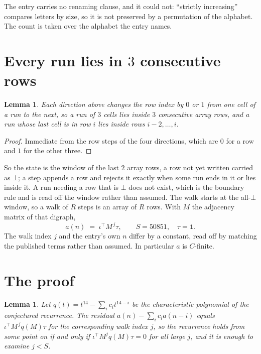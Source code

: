 \documentclass[11pt,a4paper]{article}
\theoremstyle{plain}
\newtheorem{lemma}[theorem]{Lemma}
\theoremstyle{definition}
\begin{document}
The entry carries no renaming clause, and it could not: ``strictly increasing'' compares
letters by size, so it is not preserved by a permutation of the alphabet. The count is taken
over the alphabet the entry names.

\section{Every run lies in $3$ consecutive rows}

\begin{lemma}\label{lem:win}
Each direction above changes the row index by $0$ or $1$ from one cell of a run to the next, so
a run of $3$ cells lies inside $3$ consecutive array rows, and a run whose last cell is in
row $i$ lies inside rows $i-2,\dots,i$.
\end{lemma}

\begin{proof}
Immediate from the row steps of the four directions, which are $0$ for a row and $1$ for the
other three.
\end{proof}

So the state is the window of the last $2$ array rows, a row not yet written carried as
$\bot$; a step appends a row and rejects it exactly when some run ends in it or lies inside it.
A run needing a row that is $\bot$ does not exist, which is the boundary rule and is read off
the window rather than assumed. The walk starts at the all-$\bot$ window, so a walk of $R$ steps
is an array of $R$ rows. With $M$ the adjacency matrix of that digraph,
\[
a(n)\;=\;\iota^{\!\top}M^{\,j}\tau ,\qquad S=50851,\quad\tau=\mathbf{1} .
\]
The walk index $j$ and the entry's own $n$ differ by a constant, read off by matching the
published terms rather than assumed. In particular $a$ is $C$-finite.

\section{The proof}

\begin{lemma}\label{lem:crit}
Let $q(t)=t^{14}-\sum_i c_it^{14-i}$ be the characteristic polynomial of the
conjectured recurrence. The residual $a(n)-\sum_ic_ia(n-i)$ equals
$\iota^{\!\top}M^{\,j}q(M)\tau$ for the corresponding walk index $j$, so the recurrence
holds from some point on if and only if $\iota^{\!\top}M^{j}q(M)\tau=0$ for all large $j$,
and it is enough to examine $j<S$.
\end{lemma}
\end{document}
